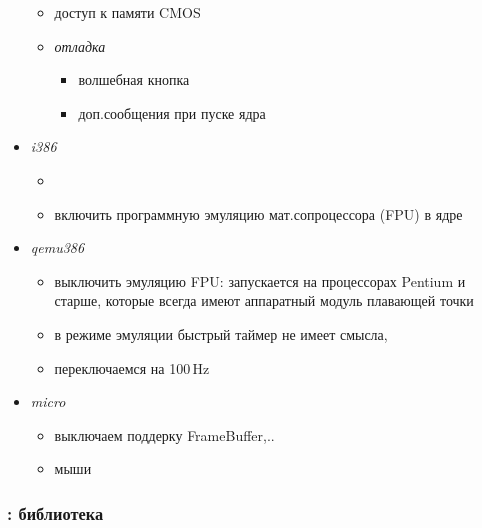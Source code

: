 \begin{itemize}
\begin{itemize}
\item {} доступ к памяти CMOS

\item \emph{отладка}
  \begin{itemize}
\item {} волшебная кнопка 
\item {} доп.сообщения при пуске ядра
  \end{itemize}

  \end{itemize}

  \item {} \emph{i386} 

\begin{itemize}
  \item {}
  \item {} включить программную эмуляцию мат.сопроцессора
  (FPU) в ядре
\end{itemize}
   
  \item {} \emph{qemu386} 
  
\begin{itemize}
\item {} выключить эмуляцию FPU:  запускается
на процессорах Pentium и старше, которые всегда имеют аппаратный модуль
плавающей точки
\item {}  в режиме эмуляции быстрый таймер не
имеет смысла,

\item {} переключаемся на 100\,Hz
\end{itemize}

\item {} \emph{micro}

\begin{itemize}
\item {} выключаем поддерку FrameBuffer,.. 
\item {} мыши
\end{itemize}
  
\end{itemize}

\subsubsection{: библиотека } \label{azulibc}

